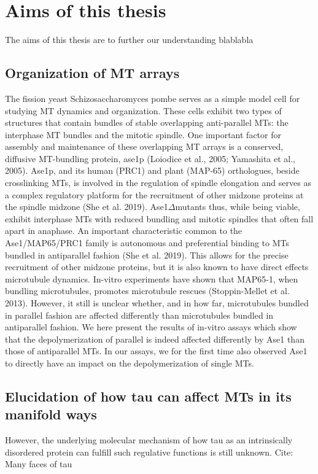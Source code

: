 \chapter{Aims of this thesis}
\label{aims}
The aims of this thesis are to further our understanding blablabla

\section{Organization of MT arrays}
The fission yeast Schizosaccharomyces pombe serves as a simple model cell for studying MT dynamics and organization. These cells exhibit two types of structures that contain bundles of stable overlapping anti-parallel MTs: the interphase MT bundles and the mitotic spindle. One important factor for assembly and maintenance of these overlapping MT arrays is a conserved, diffusive MT-bundling protein, ase1p (Loiodice et al., 2005; Yamashita et al., 2005). Ase1p, and its human (PRC1) and plant (MAP-65) orthologues, beside crosslinking MTs, is involved in the regulation of spindle elongation and serves as a complex regulatory platform for the recruitment of other midzone proteins at the spindle midzone (She et al. 2019). Ase1$\Delta$mutants thus, while being viable, exhibit interphase MTs with reduced bundling and mitotic spindles that often fall apart in anaphase. 
An important characteristic common to the Ase1/MAP65/PRC1 family is autonomous and preferential binding to MTs bundled in antiparallel fashion (She et al. 2019). This allows for the precise recruitment of other midzone proteins, but it is also known to have direct effects microtubule dynamics.  In-vitro experiments have shown that MAP65-1, when bundling microtubules, promotes microtubule rescues (Stoppin-Mellet et al. 2013). However, it still is unclear whether, and in how far, microtubules bundled in parallel fashion are affected differently than microtubules bundled in antiparallel fashion. 
We here present the results of in-vitro assays which show that the depolymerization of parallel is indeed affected differently by Ase1 than those of antiparallel MTs. In our assays, we for the first time also observed Ase1 to directly have an impact on the depolymerization of single MTs. 

\section{Elucidation of how tau can affect MTs in its manifold ways}
However, the underlying molecular mechanism of how tau as an intrinsically disordered protein can fulfill such regulative functions is still unknown. Cite: Many faces of tau